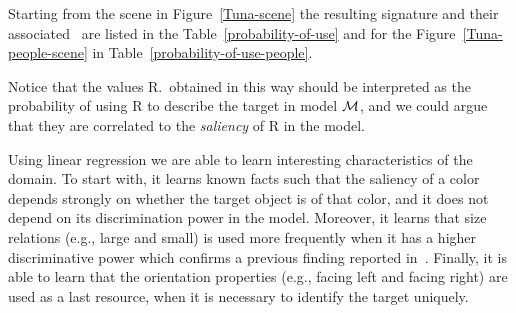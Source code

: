 Starting from the scene in Figure~\ref{Tuna-scene}
the resulting signature and their associated \puse\ are listed in the Table~\ref{probability-of-use} and for the Figure~\ref{Tuna-people-scene} in Table~\ref{probability-of-use-people}. 

Notice that the values R.\puse\ obtained in this way should be interpreted as the probability of using R to describe the target in model 
$\mathcal{M}$, and we could argue that they are correlated to the \emph{saliency} of R in the model.  

Using linear regression we are able to learn interesting characteristics of the domain. To start with, it learns known facts such that the 
saliency of a color depends strongly on whether the target object is of that color, and it does not depend on its discrimination power 
in the model. Moreover, it learns that size relations (e.g., large and small) is used more frequently when it has a higher discriminative power
which confirms a previous finding reported in~\cite{viet:gene11}. Finally, it is able to learn that the orientation properties (e.g., facing left and facing right) are used as a last resource, when it is necessary to identify the target uniquely. 

